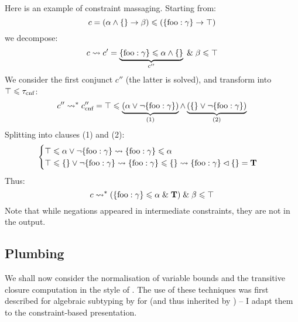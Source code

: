 \begin{example}
Here is an example of constraint massaging. 
Starting from:
$$ c = (\alpha \meet \flrec{} \to \beta) \sub (\flrec{\mathrm{foo}: \gamma} \to \top) $$
we decompose:
$$ c \step c' = \underbrace{\flrec{\mathrm{foo}: \gamma} \sub \alpha \meet \flrec{}}_{c''} \und \beta \sub \top $$
We consider the first conjunct $c''$ (the latter is solved), and transform into $\top \leqslant \tau_\text{cnf}$:
$$ c'' \step^* c''_\text{cnf} = \top \sub \underbrace{\left( \alpha \join \comp \flrec{\mathrm{foo}: \gamma} \right)}_\text{(1)} \meet \underbrace{\left( \flrec{} \join \comp \flrec{\mathrm{foo}: \gamma} \right)}_\text{(2)} $$
Splitting into clauses (1) and (2):
$$ \begin{cases} 
    \top \sub \alpha \join \comp \flrec{\mathrm{foo}: \gamma} \step \flrec{\mathrm{foo}: \gamma} \sub \alpha
    \\
    \top \sub \flrec{} \join \comp \flrec{\mathrm{foo}: \gamma} \step \flrec{\mathrm{foo}: \gamma} \sub \flrec{} \step \flrec{\mathrm{foo}: \gamma} \cdecomp \flrec{} = \tru
\end{cases}$$
Thus:
$$ c \step^* (\flrec{\mathrm{foo}: \gamma} \sub \alpha \und \tru) \und \beta \sub \top $$
Note that while negations appeared in intermediate constraints, they are not in the output.
\end{example}

\subsection{Plumbing}
    \label{subsec:normalisation}
    
\newcommand{\sbnd}{W}

We shall now consider the normalisation of variable bounds and the transitive closure computation in the style of \textcite{pottier-framework}. The use of these techniques was first described for algebraic subtyping by \textcite{simple-sub} for \simplesub{} (and thus inherited by \mlstruct{}) -- I adapt them to the constraint-based presentation.

